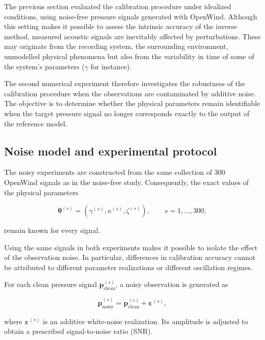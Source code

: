 \documentclass[11pt,a4paper]{report}
\theoremstyle{plain}
\theoremstyle{definition}
\begin{document}
The previous section evaluated the calibration procedure under idealized
conditions, using noise-free pressure signals generated with OpenWind. Although
this setting makes it possible to assess the intrinsic accuracy of the inverse
method, measured acoustic signals are inevitably affected by perturbations.
These may originate from the recording system, the surrounding environment,
unmodelled physical phenomena but also from the variability in time of some 
of the system's parameters ($\gamma$ for instance). 

The second numerical experiment therefore investigates the robustness of the
calibration procedure when the observations are contaminated by additive
noise. The objective is to determine whether the physical parameters remain
identifiable when the target pressure signal no longer corresponds exactly to
the output of the reference model.

\subsection{Noise model and experimental protocol}

The noisy experiments are constructed from the same collection of
\(300\) OpenWind signals as in the noise-free study. Consequently, the exact
values of the physical parameters

\begin{equation}
\boldsymbol{\theta}^{(s)}
=
\left(
\gamma^{(s)},
\kappa^{(s)},
\zeta^{(s)}
\right),
\qquad
s=1,\ldots,300,
\end{equation}

remain known for every signal.

Using the same signals in both experiments makes it possible to isolate the
effect of the observation noise. In particular, differences in calibration
accuracy cannot be attributed to different parameter realizations or different
oscillation regimes.

For each clean pressure signal
\(\mathbf{p}_{\mathrm{clean}}^{(s)}\), a noisy observation is generated as

\begin{equation}
\mathbf{p}_{\mathrm{noisy}}^{(s)}
=
\mathbf{p}_{\mathrm{clean}}^{(s)}
+
\boldsymbol{\varepsilon}^{(s)},
\label{eq:noisy_observation}
\end{equation}

where \(\boldsymbol{\varepsilon}^{(s)}\) is an additive white-noise realization.
Its amplitude is adjusted to obtain a prescribed signal-to-noise ratio (SNR).
\end{document}
